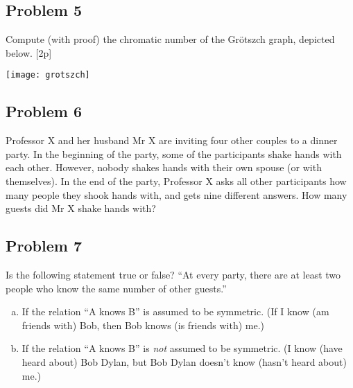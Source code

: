 \documentclass{amsart}
\theoremstyle{definition} \newtheorem*{definition}{Definition}
\theoremstyle{remark} \newtheorem*{ex}{Example}
\begin{document}
\subsection*{Problem 5}
Compute (with proof) the chromatic number of the Gr\"otszch graph, depicted below. [2p]
\begin{center}
\texttt{[image: grotszch]}
\end{center}

\subsection*{Problem 6}
Professor X and her husband Mr X are inviting four other couples to a dinner party. In the beginning of the party, some of the participants shake hands with each other. However, nobody shakes hands with their own spouse (or with themselves). In the end of the party, Professor X asks all other participants how many people they shook hands with, and gets nine different answers. How many guests did Mr X shake hands with?

\subsection*{Problem 7}
Is the following statement true or false? ``At every party, there are at least two people who know the same number of other guests.''
\begin{enumerate}[a)]
 \item If the relation ``A knows B'' is assumed to be symmetric. (If I know (am friends with) Bob, then Bob knows (is friends with) me.)
\item If the relation ``A knows B'' is {\em not} assumed to be symmetric. (I know (have heard about) Bob Dylan, but Bob Dylan doesn't know (hasn't heard about) me.)
\end{enumerate}
\end{document}
